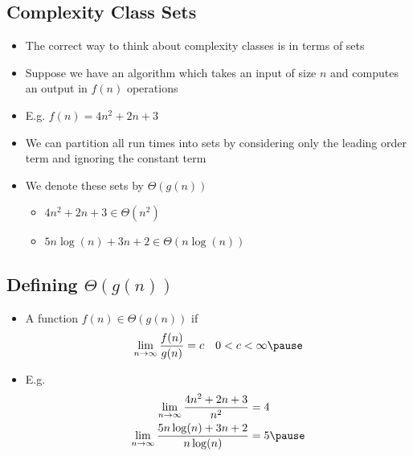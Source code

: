 
\begin{slide}
\section[-2]{Complexity Class Sets}

\begin{PauseHighLight}
  \begin{itemize}
  \item The correct way to think about complexity classes is in terms of
    sets\pause
  \item Suppose we have an algorithm which takes an input of size $n$
    and computes an output in $f(n)$ operations\pause
  \item E.g. $f(n) = 4 n^2 + 2n +3$\pause
  \item We can partition all run times into sets by considering only the
    leading order term and ignoring the constant term\pause
  \item We denote these sets by $\Theta(g(n))$\pause
    \begin{itemize}
    \item $4 n^2 + 2n +3 \in \Theta(n^2)$
    \item $5 n \log(n) + 3 n + 2 \in \Theta(n\log(n))$\pause 
    \end{itemize}
  \end{itemize}
\end{PauseHighLight}

\end{slide}


\begin{slide}
\section[-1]{Defining $\Theta(g(n))$}

\begin{PauseHighLight}
  \begin{itemize}
  \item A function $f(n) \in \Theta(g(n))$ if
    \begin{align*}
      \lim_{n\rightarrow\infty} \frac{f(n)}{g(n)} &= c  & 0<c<\infty\pause
    \end{align*}
  \item E.g.
    \begin{align*}
      \lim_{n\rightarrow\infty} \frac{4 n^2 + 2n +3}{n^2} &= 4 \\
      \lim_{n\rightarrow\infty} \frac{5 n \log(n) + 3 n + 2}{n\log(n)}
      &= 5\pause
    \end{align*}
  \end{itemize}
\end{PauseHighLight}

\end{slide}

